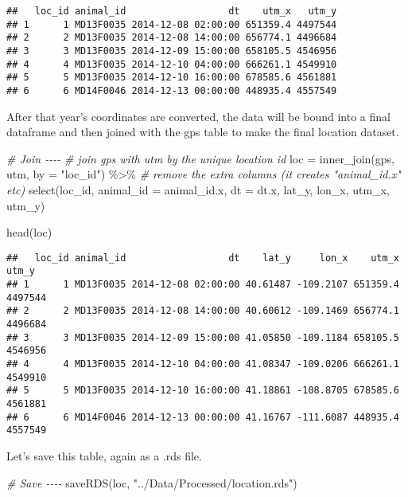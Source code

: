 \documentclass[
]{book}
\newenvironment{Shaded}{\begin{snugshade}}{\end{snugshade}}
\newcommand{\AttributeTok}[1]{\textcolor[rgb]{0.77,0.63,0.00}{#1}}
\newcommand{\CommentTok}[1]{\textcolor[rgb]{0.56,0.35,0.01}{\textit{#1}}}
\newcommand{\FunctionTok}[1]{\textcolor[rgb]{0.00,0.00,0.00}{#1}}
\newcommand{\NormalTok}[1]{#1}
\newcommand{\OtherTok}[1]{\textcolor[rgb]{0.56,0.35,0.01}{#1}}
\newcommand{\SpecialCharTok}[1]{\textcolor[rgb]{0.00,0.00,0.00}{#1}}
\newcommand{\StringTok}[1]{\textcolor[rgb]{0.31,0.60,0.02}{#1}}
\begin{document}
\begin{verbatim}
##   loc_id animal_id                  dt    utm_x   utm_y
## 1      1 MD13F0035 2014-12-08 02:00:00 651359.4 4497544
## 2      2 MD13F0035 2014-12-08 14:00:00 656774.1 4496684
## 3      3 MD13F0035 2014-12-09 15:00:00 658105.5 4546956
## 4      4 MD13F0035 2014-12-10 04:00:00 666261.1 4549910
## 5      5 MD13F0035 2014-12-10 16:00:00 678585.6 4561881
## 6      6 MD14F0046 2014-12-13 00:00:00 448935.4 4557549
\end{verbatim}

After that year's coordinates are converted, the data will be bound into a final dataframe and then joined with the gps table to make the final location dataset.

\begin{Shaded}
\begin{Highlighting}[]
\CommentTok{\# Join {-}{-}{-}{-}}
\CommentTok{\# join gps with utm by the unique location id}
\NormalTok{loc }\OtherTok{=} \FunctionTok{inner\_join}\NormalTok{(gps, utm, }\AttributeTok{by =} \StringTok{"loc\_id"}\NormalTok{) }\SpecialCharTok{\%\textgreater{}\%}
  \CommentTok{\# remove the extra columns (it creates "animal\_id.x" etc)}
  \FunctionTok{select}\NormalTok{(loc\_id, }\AttributeTok{animal\_id =}\NormalTok{ animal\_id.x, }\AttributeTok{dt =}\NormalTok{ dt.x, lat\_y, lon\_x, utm\_x, utm\_y)}

\FunctionTok{head}\NormalTok{(loc)}
\end{Highlighting}
\end{Shaded}

\begin{verbatim}
##   loc_id animal_id                  dt    lat_y     lon_x    utm_x   utm_y
## 1      1 MD13F0035 2014-12-08 02:00:00 40.61487 -109.2107 651359.4 4497544
## 2      2 MD13F0035 2014-12-08 14:00:00 40.60612 -109.1469 656774.1 4496684
## 3      3 MD13F0035 2014-12-09 15:00:00 41.05850 -109.1184 658105.5 4546956
## 4      4 MD13F0035 2014-12-10 04:00:00 41.08347 -109.0206 666261.1 4549910
## 5      5 MD13F0035 2014-12-10 16:00:00 41.18861 -108.8705 678585.6 4561881
## 6      6 MD14F0046 2014-12-13 00:00:00 41.16767 -111.6087 448935.4 4557549
\end{verbatim}

Let's save this table, again as a .rds file.

\begin{Shaded}
\begin{Highlighting}[]
\CommentTok{\# Save {-}{-}{-}{-}}
\FunctionTok{saveRDS}\NormalTok{(loc, }\StringTok{"../Data/Processed/location.rds"}\NormalTok{)}
\end{Highlighting}
\end{Shaded}
\end{document}
